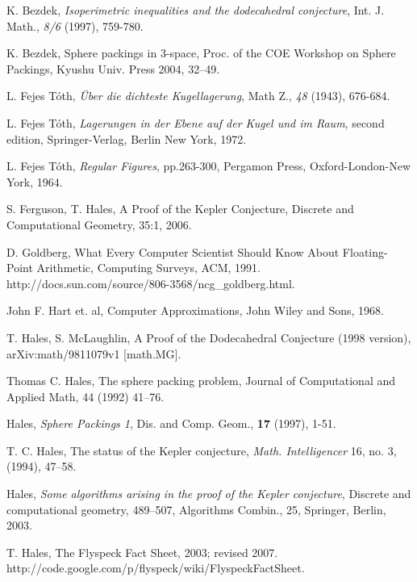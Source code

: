 \documentclass{llncs}
\begin{document}
\begin{thebibliography}{HeHa94}

 K. Bezdek, {\it Isoperimetric inequalities and the
dodecahedral conjecture}, Int. J. Math., \emph{8/6} (1997), 759-780.

 K. Bezdek, Sphere packings in $3$-space,
Proc. of the COE Workshop on Sphere Packings, Kyushu Univ. Press 2004, 32--49.

 L. Fejes T\'oth, {\it \"Uber die dichteste
Kugellagerung}, Math Z., \emph{48} (1943), 676-684.

 L. Fejes T\'oth, {\it Lagerungen in der Ebene auf der
    Kugel und im Raum}, second edition,
    Springer-Verlag, Berlin New York, 1972.

 L. Fejes T\'oth, {\it Regular Figures}, pp.263-300,
Pergamon Press, Oxford-London-New York, 1964.


 S. Ferguson, T. Hales, A Proof of the
Kepler Conjecture, 
Discrete and Computational Geometry, 35:1, 2006.

 D. Goldberg, What Every Computer Scientist Should
Know About Floating-Point Arithmetic, Computing Surveys, ACM, 1991.
http://docs.sun.com/source/806-3568/ncg\_goldberg.html.

 John F. Hart et. al, Computer Approximations, John
Wiley and Sons, 1968.

 T. Hales, S. McLaughlin,
A Proof of the Dodecahedral Conjecture (1998 version),  	arXiv:math/9811079v1 [math.MG].

 Thomas C. Hales, The sphere packing problem, Journal
of Computational and Applied Math, 44 (1992) 41--76.

 Hales, {\it Sphere Packings 1}, Dis. and Comp. Geom., 
{\bf 17} (1997), 1-51.

 T. C. Hales, The status of the Kepler conjecture,
    {\it Math. Intelligencer} 16, no. 3, (1994), 47--58.

 Hales, {\it Some algorithms arising in the proof of the
	Kepler conjecture}, 
	Discrete and computational
geometry, 489--507, Algorithms Combin., 25, Springer, Berlin,
2003.
	
	   T. Hales, The Flyspeck Fact Sheet, 2003; revised
2007. http://code.google.com/p/flyspeck/wiki/FlyspeckFactSheet.
	

\end{thebibliography}
\end{document}
